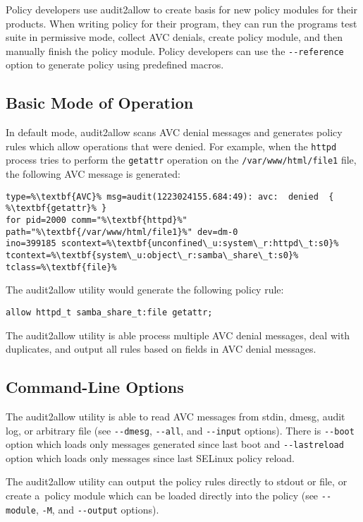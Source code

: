 Policy developers use audit2allow to create basis for new policy modules for
their products. When writing policy for their program, they can run the
programs test suite in permissive mode, collect AVC denials, create policy
module, and then manually finish the policy module. Policy developers can use
the \texttt{-{}-reference} option to generate policy using predefined macros.

\subsection{Basic Mode of Operation}
In default mode, audit2allow scans AVC denial messages and generates policy
rules which allow operations that were denied. For example, when the
\texttt{httpd} process tries to perform the \texttt{getattr} operation on the
\texttt{/var/www/html/file1} file, the following AVC message is generated:
\begin{lstlisting}[escapechar=\%]
type=%\textbf{AVC}% msg=audit(1223024155.684:49): avc:  denied  { %\textbf{getattr}% }
for pid=2000 comm="%\textbf{httpd}%" path="%\textbf{/var/www/html/file1}%" dev=dm-0
ino=399185 scontext=%\textbf{unconfined\_u:system\_r:httpd\_t:s0}%
tcontext=%\textbf{system\_u:object\_r:samba\_share\_t:s0}% tclass=%\textbf{file}%
\end{lstlisting}
The audit2allow utility would generate the following policy rule:
\begin{lstlisting}
allow httpd_t samba_share_t:file getattr;
\end{lstlisting}
The audit2allow utility is able process multiple AVC denial messages, deal with
duplicates, and output all rules based on fields in AVC denial messages.

\subsection{Command-Line Options}
The audit2allow utility is able to read AVC messages from stdin, dmesg, audit
log, or arbitrary file (see \texttt{-{}-dmesg}, \texttt{-{}-all}, and
\texttt{-{}-input} options). There is \texttt{-{}-boot} option which loads only
messages generated since last boot and \texttt{-{}-lastreload} option which
loads only messages since last SELinux policy reload.

The audit2allow utility can output the policy rules directly to stdout or file,
or create a~policy module which can be loaded directly into the policy (see
\texttt{-{}-module}, \texttt{-M}, and \texttt{-{}-output} options).

